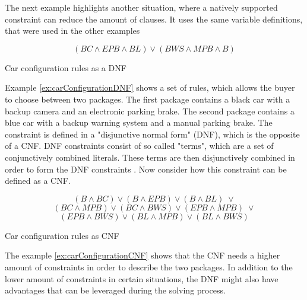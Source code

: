 The next example highlights another situation, where a natively supported constraint can reduce the amount of clauses. It uses the same variable definitions, that were used in the other examples

\begin{example}
\begin{leftbar}
\begin{displaymath}
(BC \wedge EPB \wedge BL) \vee (BWS \wedge MPB \wedge B)
\end{displaymath}
\end{leftbar}
\caption{Car configuration rules as a DNF}
\label{ex:carConfigurationDNF}
\end{example}

Example \ref{ex:carConfigurationDNF} shows a set of rules, which allows the buyer to choose between two packages. The first package contains a black car with a backup camera and an electronic parking brake. The second package contains a blue car with a backup warning system and a manual parking brake. The constraint is defined in a "disjunctive normal form" (DNF), which is the opposite of a CNF. DNF constraints consist of so called "terms", which are a set of conjunctively combined literals. These terms are then disjunctively combined in order to form the DNF constraints \cite{biere2009handbook}. Now consider how this constraint can be defined as a CNF.

\begin{example}
\begin{leftbar}
\begin{displaymath}
(B \wedge BC) \vee (B \wedge EPB) \vee (B \wedge BL) \; \vee
\end{displaymath}
\begin{displaymath}
(BC \wedge MPB) \vee (BC \wedge BWS) \vee (EPB \wedge MPB) \; \vee
\end{displaymath}
\begin{displaymath}
(EPB \wedge BWS) \vee (BL \wedge MPB) \vee (BL \wedge BWS)
\end{displaymath}
\end{leftbar}
\caption{Car configuration rules as CNF}
\label{ex:carConfigurationCNF}
\end{example}

The example \ref{ex:carConfigurationCNF} shows that the CNF needs a higher amount of constraints in order to describe the two packages. In addition to the lower amount of constraints in certain situations, the DNF might also have advantages that can be leveraged during the solving process.

